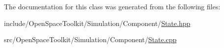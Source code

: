 The documentation for this class was generated from the following files\+:\begin{DoxyCompactItemize}
\item 
include/\+Open\+Space\+Toolkit/\+Simulation/\+Component/\hyperlink{_state_8hpp}{State.\+hpp}\item 
src/\+Open\+Space\+Toolkit/\+Simulation/\+Component/\hyperlink{_state_8cpp}{State.\+cpp}\end{DoxyCompactItemize}

